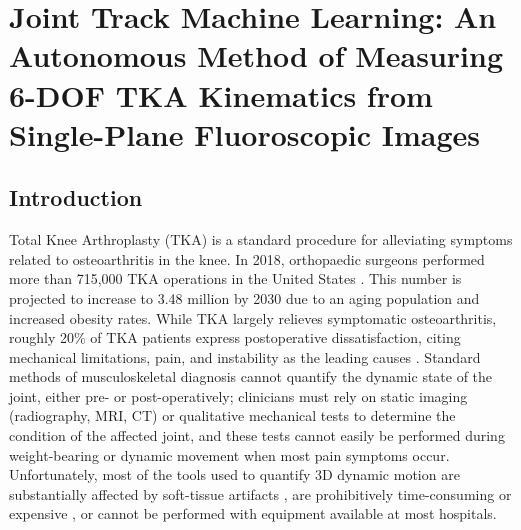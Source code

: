 \chapter{Joint Track Machine Learning: An Autonomous Method of Measuring 6-DOF TKA Kinematics from Single-Plane Fluoroscopic Images}
\label{sec:jtml}
\section{Introduction}
Total Knee Arthroplasty (TKA) is a standard procedure for alleviating symptoms related to osteoarthritis in the knee. In 2018, orthopaedic surgeons performed more than 715,000 TKA operations in the United States \cite{agencyforhealthcareresearchandqualityHCUPFastStats}. This number is projected to increase to 3.48 million by 2030 \cite{kurtzProjectionsPrimaryRevision2007} due to an aging population and increased obesity rates. While TKA largely relieves symptomatic osteoarthritis, roughly 20\% of TKA patients express postoperative dissatisfaction, citing mechanical limitations, pain, and instability as the leading causes \cite{bakerRolePainFunction2007,bournePatientSatisfactionTotal2010,scottPredictingDissatisfactionFollowing2010}. Standard methods of musculoskeletal diagnosis cannot quantify the dynamic state of the joint, either pre- or post-operatively; clinicians must rely on static imaging (radiography, MRI, CT) or qualitative mechanical tests to determine the condition of the affected joint, and these tests cannot easily be performed during weight-bearing or dynamic movement when most pain symptoms occur. Unfortunately, most of the tools used to quantify 3D dynamic motion are substantially affected by soft-tissue artifacts \cite{gaoInvestigationSoftTissue2008,stagniQuantificationSoftTissue2005,linEffectsSoftTissue2016}, are prohibitively time-consuming or expensive \cite{daemsValidationThreedimensionalTotal2016}, or cannot be performed with equipment available at most hospitals.

